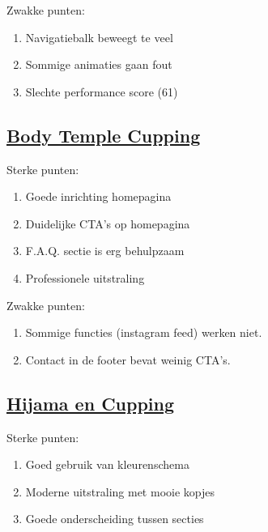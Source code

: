 \documentclass{article}
\begin{document}
\noindent Zwakke punten:
\begin{enumerate}
    \item Navigatiebalk beweegt te veel
    \item Sommige animaties gaan fout
    \item Slechte performance score (61)
\end{enumerate}

\subsection{\href{https://bodytemplecupping.nl/}{Body Temple Cupping}}

Sterke punten:
\begin{enumerate}
    \item Goede inrichting homepagina
    \item Duidelijke CTA's op homepagina
    \item F.A.Q. sectie is erg behulpzaam
    \item Professionele uitstraling
\end{enumerate}

\noindent Zwakke punten:
\begin{enumerate}
    \item Sommige functies (instagram feed) werken niet.
    \item Contact in de footer bevat weinig CTA's.
\end{enumerate}

\subsection{\href{https://hijamaencupping.nl/}{Hijama en Cupping}}

Sterke punten:
\begin{enumerate}
    \item Goed gebruik van kleurenschema
    \item Moderne uitstraling met mooie kopjes
    \item Goede onderscheiding tussen secties
\end{enumerate}
\pagebreak
\end{document}
